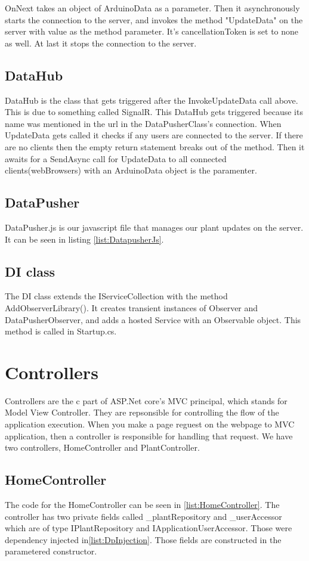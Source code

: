 \documentclass[a4paper,12pt,oneside,openright,titlepage]{book}
\begin{document}
OnNext takes an object of ArduinoData as a parameter. Then it asynchronously starts the connection to the server, and invokes the method "UpdateData" on the server with value as the method parameter. It's cancellationToken is set to none as well. At last it stops the connection to the server. 




\subsection{DataHub}
DataHub is the class that gets triggered after the InvokeUpdateData call above. This is due to something called SignalR. This DataHub gets triggered because its name was mentioned in the url in the DataPusherClass's connection. When UpdateData gets called it checks if any users are connected to the server. If there are no clients then the empty return statement breaks out of the method. Then it awaits for a SendAsync call for UpdateData to all connected clients(webBrowsers) with an ArduinoData object is the paramenter.

\subsection{DataPusher}
DataPusher.js is our javascript file that manages our plant updates on the server. It can be seen in listing \ref{list:DatapusherJs}.

\subsection{DI class}
The DI class extends the IServiceCollection with the method AddObserverLibrary(). It creates transient instances of Observer and DataPusherObserver, and adds a hosted Service with an Observable object. This method is called in Startup.cs.


\section{Controllers}
Controllers are the c part of ASP.Net core's MVC principal, which stands for Model View Controller. They are repsonsible for controlling the flow of the application execution. When you make a page reguest on the webpage to MVC application, then a controller is responsible for handling that request. We have two controllers,  HomeController and PlantController.
\subsection{HomeController}
The code for the HomeController can be seen in \ref{list:HomeController}. The controller has two private fields called \_plantRepository and \_userAccessor which are of type IPlantRepository and IApplicationUserAccessor. Those were dependency injected in\ref{list:DpInjection}. Those fields are constructed in the parametered constructor. 
\end{document}
